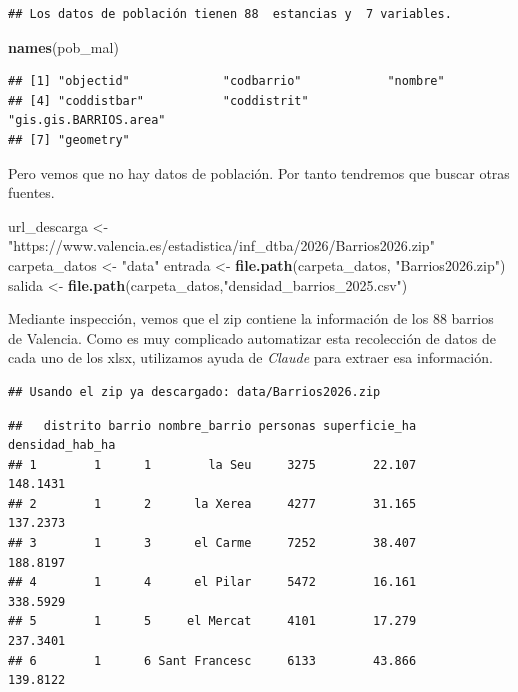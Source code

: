 \documentclass[notspecified,article,submit,moreauthors,pdftex]{Definitions/mdpi}
\newenvironment{Shaded}{\begin{snugshade}}{\end{snugshade}}
\newcommand{\FunctionTok}[1]{\textcolor[rgb]{0.13,0.29,0.53}{\textbf{#1}}}
\newcommand{\NormalTok}[1]{#1}
\newcommand{\OtherTok}[1]{\textcolor[rgb]{0.56,0.35,0.01}{#1}}
\newcommand{\StringTok}[1]{\textcolor[rgb]{0.31,0.60,0.02}{#1}}
\begin{document}
\begin{verbatim}
## Los datos de población tienen 88  estancias y  7 variables.
\end{verbatim}

\begin{Shaded}
\begin{Highlighting}[]
\FunctionTok{names}\NormalTok{(pob\_mal)}
\end{Highlighting}
\end{Shaded}

\begin{verbatim}
## [1] "objectid"             "codbarrio"            "nombre"              
## [4] "coddistbar"           "coddistrit"           "gis.gis.BARRIOS.area"
## [7] "geometry"
\end{verbatim}

Pero vemos que no hay datos de población. Por tanto tendremos que buscar
otras fuentes.

\begin{Shaded}
\begin{Highlighting}[]
\NormalTok{url\_descarga }\OtherTok{\textless{}{-}} \StringTok{"https://www.valencia.es/estadistica/inf\_dtba/2026/Barrios2026.zip"}
\NormalTok{carpeta\_datos }\OtherTok{\textless{}{-}} \StringTok{"data"}
\NormalTok{entrada }\OtherTok{\textless{}{-}} \FunctionTok{file.path}\NormalTok{(carpeta\_datos, }\StringTok{"Barrios2026.zip"}\NormalTok{)}
\NormalTok{salida  }\OtherTok{\textless{}{-}} \FunctionTok{file.path}\NormalTok{(carpeta\_datos,}\StringTok{"densidad\_barrios\_2025.csv"}\NormalTok{)}
\end{Highlighting}
\end{Shaded}

Mediante inspección, vemos que el zip contiene la información de los 88
barrios de Valencia. Como es muy complicado automatizar esta recolección
de datos de cada uno de los xlsx, utilizamos ayuda de \emph{Claude} para
extraer esa información.

\begin{verbatim}
## Usando el zip ya descargado: data/Barrios2026.zip
\end{verbatim}

\begin{verbatim}
##   distrito barrio nombre_barrio personas superficie_ha densidad_hab_ha
## 1        1      1        la Seu     3275        22.107        148.1431
## 2        1      2      la Xerea     4277        31.165        137.2373
## 3        1      3      el Carme     7252        38.407        188.8197
## 4        1      4      el Pilar     5472        16.161        338.5929
## 5        1      5     el Mercat     4101        17.279        237.3401
## 6        1      6 Sant Francesc     6133        43.866        139.8122
\end{verbatim}
\end{document}
